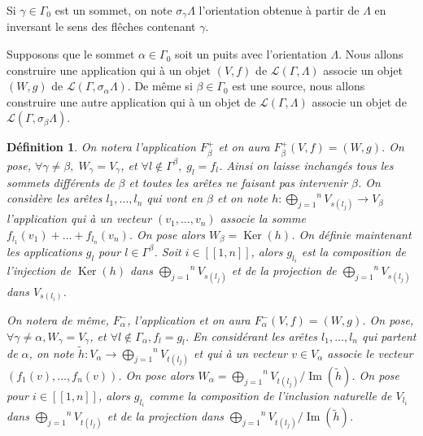 \documentclass[a4paper,10pt]{article}
\newtheorem{defi}[]{Définition}[section]
\DeclareMathOperator{\Ker}{Ker}
\DeclareMathOperator{\Img}{Im}
\begin{document}
Si $\gamma \in \Gamma_0$ est un sommet, on note $\sigma_{\gamma}\Lambda$ l'orientation obtenue à partir de $\Lambda$ en inversant le sens des flêches contenant $\gamma$.

Supposons que le sommet $\alpha \in \Gamma_{0}$ soit un puits avec l'orientation $\Lambda$.  Nous allons construire une application qui à un objet $(V,f)$ de $\mathscr{L}(\Gamma,\Lambda)$ associe un objet $(W,g)$ de $\mathscr{L}(\Gamma,\sigma_{\alpha}\Lambda)$. De même si $\beta \in \Gamma_0$ est une source, nous allons construire une autre application qui à un objet de $\mathscr L(\Gamma,\Lambda)$ associe un objet de $\mathscr L(\Gamma,\sigma_{\beta}\Lambda)$. 

\begin{defi}
	On notera l'application $F_{\beta}^{+}$ et on aura $F_{\beta}^{+}(V,f)=(W,g)$. On pose, $\forall \gamma\neq\beta,\;W_{\gamma}=V_{\gamma}$, et $\forall l \notin \Gamma^{\beta},\; g_{l}=f_{l}$. Ainsi on laisse inchangés tous les sommets différents de $\beta$ et toutes les arêtes ne faisant pas intervenir $\beta$. On considère les arêtes $l_{1},\dots,l_{n}$ qui vont en $\beta$ et on note $h:\overset{n}{\underset{j=1}{\bigoplus}}V_{s(l_{j})}\rightarrow V_{\beta}$ l'application qui à un vecteur $(v_{1},\dots,v_{n})$ associe la somme $f_{l_{1}}(v_{1})+\dots+f_{l_{n}}(v_{n})$. On pose alors $W_{\beta}=\Ker(h)$. On définie maintenant les applications $g_{l}$ pour $l\in\Gamma^{\beta}$. Soit $i\in[\![1,n]\!]$, alors $g_{l_{i}}$ est la composition de l'injection de $\Ker(h)$ dans $\overset{n}{\underset{j=1}{\bigoplus}}V_{s(l_{j})}$ et de la projection de $\overset{n}{\underset{j=1}{\bigoplus}}V_{s(l_{j})}$ dans $V_{s(l_{i})}$. 

	On notera de même, $F^{-}_{\alpha}$, l'application et on aura $F^{-}_{\alpha}(V,f) = (W,g)$. On pose, $\forall \gamma \neq \alpha, W_\gamma = V_\gamma$, et $\forall l \notin \Gamma_\alpha, f_l = g_l$. En considérant les arêtes $l_1, \dots, l_n$ qui partent de $\alpha$, on note $\widetilde{h} : V_\alpha \rightarrow \overset{n}{\underset{j=1}{\bigoplus}}V_{t(l_{j})}$ et qui à un vecteur $v \in V_\alpha$ associe le vecteur $(f_1(v),\dots, f_n(v))$. On pose alors $W_\alpha = \overset{n}{\underset{j=1}{\bigoplus}}V_{t(l_{j})}/\Img(\widetilde{h})$. On pose pour $i\in [\![1,n]\!]$, alors $g_{l_i}$ comme la composition de l'inclusion naturelle de $V_{l_i}$ dans $\overset{n}{\underset{j=1}{\bigoplus}}V_{t(l_{j})}$ et de la projection dans $\overset{n}{\underset{j=1}{\bigoplus}}V_{t(l_{j})}/\Img(\widetilde h)$.

\end{defi}
\end{document}
